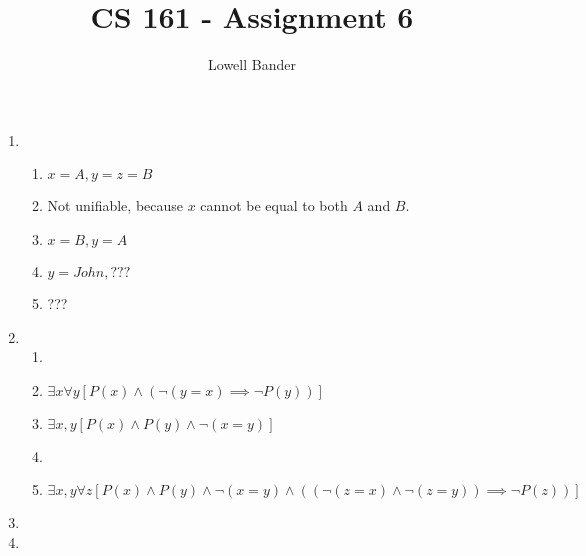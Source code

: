 \documentclass[]{article}
\begin{document}
\title{CS 161 - Assignment 6}
\author{Lowell Bander}
\maketitle

\begin{enumerate}
\item \begin{enumerate}
\item $x = A, y = z = B$
\item Not unifiable, because $x$ cannot be equal to both $A$ and $B$.
\item $x = B, y = A$
\item $y = John, ???$
\item ???
\end{enumerate}

\item \begin{enumerate}
\item 
\item $\exists x \forall y [P(x) \land (\neg(y=x) \implies \neg P(y))]$
\item $\exists x,y [P(x) \land P(y) \land \neg(x = y)]$
\item 
\item $\exists x,y \forall z [P(x) \land P(y) \land \neg(x = y)\land ((\neg(z = x) \land \neg(z = y)) \implies \neg P(z))]$
\end{enumerate}

\item
\item

\end{enumerate}
\end{document}

